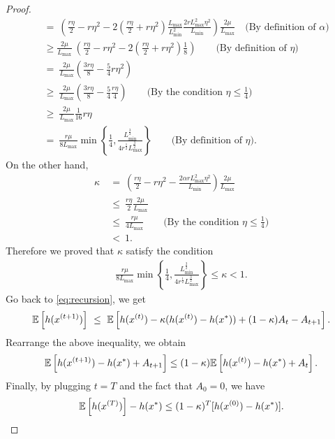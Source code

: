 \begin{proof}
\begin{align*}
        &~=~ \left( \frac{r \eta }{2} - r \eta^2 - 2\left( \frac{r \eta}{2} + r \eta^2 \right) \frac{L_{\max}}{L_{\min}^2} \frac{2  r L_{\max}^2 \eta^2}{L_{\min}} \right) \frac{2\mu}{ L_{\max}} \quad \text{(By definition of $\alpha$)} \\
        &~\geq  \frac{2\mu}{ L_{\max}}~ \left( \frac{r \eta }{2} - r \eta^2 - 2\left( \frac{r \eta}{2} + r \eta^2 \right) \frac{1}{8} \right) \qquad \text{(By definition of $\eta$)} \\
        &~=~  \frac{2\mu}{ L_{\max}} \left( \frac{3r \eta}{8} - \frac{5}{4} r \eta^2 \right)  \\
        &~\geq~  \frac{2\mu}{ L_{\max}} \left( \frac{3r \eta}{8} - \frac{5}{4} \frac{r \eta}{4} \right) \qquad \text{(By the condition $\eta \leq \frac{1}{4}$)} \\
        &~\geq~  \frac{2\mu}{ L_{\max}} \frac{1}{16} r \eta \\
        &~=~  \frac{ r \mu }{ 8 L_{\max}} \min \left\{ \frac{1}{4}, \frac{L_{\min}^{\frac{3}{2}}}{4 r^{\frac{1}{2}} L_{\max}^{\frac{3}{2}} } \right\} \qquad \text{(By definition of $\eta$)}.
    \end{align*}
    On the other hand, 
    \begin{align*}
        \kappa &~=~ \left( \frac{r \eta }{2} - r \eta^2 - \frac{2 \alpha r L_{\max}^2 \eta^2}{L_{\min}} \right) \frac{2\mu}{ L_{\max}} \\
        &~\leq~ \frac{r \eta }{2} \frac{2\mu}{ L_{\max}} \\
        &~\leq~ \frac{r \mu}{4 L_{\max}}  \qquad \text{(By the condition $\eta \leq \frac{1}{4}$)} \\
        &~<~ 1.
    \end{align*}
    Therefore we proved that $\kappa$ satisfy the condition
    \begin{align}
      \frac{r \mu}{ 8 L_{\max}} \min \left\{ \frac{1}{4}, \frac{L_{\min}^{\frac{3}{2}}}{4 r^{\frac{1}{2}} L_{\max}^{\frac{3}{2}} } \right\} \leq  \kappa < 1. \label{eq:kappa_condition}
    \end{align}
    Go back to \eqref{eq:recursion}, we get
    \begin{align}
        \mathbb{E} \left[ h( x^{(t+1)} ) \right] ~\leq~ \mathbb{E}\left[ h(x^{(t)}) - \kappa ( h(x^{(t)}) - h(x^*) ) + (1 - \kappa) A_t - A_{t+1} \right].
    \end{align}
    Rearrange the above inequality, we obtain
    \[
        \mathbb{E} \left[ h( x^{(t+1)} ) - h(x^*) + A_{t+1} \right] \leq (1 - \kappa)  \mathbb{E} \left[ h( x^{(t)} ) - h(x^*) + A_{t} \right].
    \]
    Finally, by plugging $t = T$ and the fact that $A_0 = 0$, we have 
    \[\mathbb{E} \left[ h( x^{(T)} )\right] - h(x^*) \leq (1 - \kappa)^T[h(x^{(0)}) - h(x^*)].\]
\end{proof}


